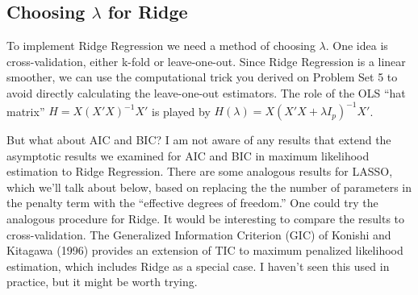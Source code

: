 \documentclass[12pt]{article}
\theoremstyle{definition}
\begin{document}
\subsection{Choosing $\lambda$ for Ridge}
To implement Ridge Regression we need a method of choosing $\lambda$. One idea is cross-validation, either k-fold or leave-one-out. Since Ridge Regression is a linear smoother, we can use the computational trick you derived on Problem Set 5 to avoid directly calculating the leave-one-out estimators. The role of the OLS ``hat matrix'' $H = X(X'X)^{-1}X'$ is played by $H(\lambda) = X(X'X + \lambda I_p)^{-1} X'$.

But what about AIC and BIC? I am not aware of any results that extend the asymptotic results we examined for AIC and BIC in maximum likelihood estimation to Ridge Regression. There are some analogous results for LASSO, which we'll talk about below, based on replacing the the number of parameters in the penalty term with the ``effective degrees of freedom.'' One could try the analogous procedure for Ridge. It would be interesting to compare the results to cross-validation. The Generalized Information Criterion (GIC) of Konishi and Kitagawa (1996) provides an extension of TIC to maximum penalized likelihood estimation, which includes Ridge as a special case. I haven't seen this used in practice, but it might be worth trying.
\end{document}
